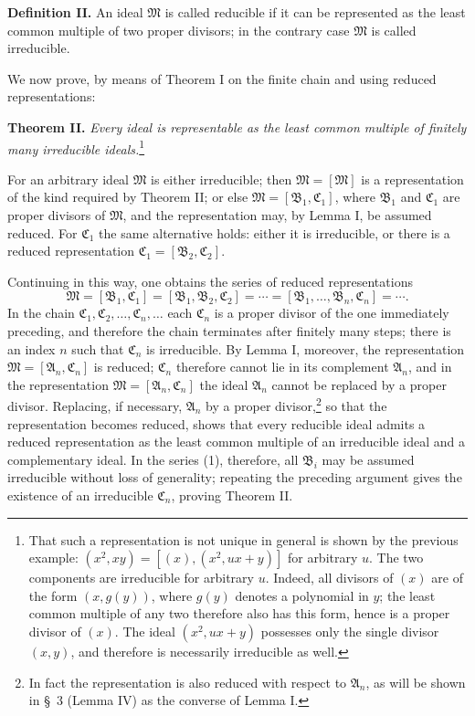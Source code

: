 \documentclass[11pt]{article}
\providecommand{\ideal}[1]{\mathfrak{#1}}
\begin{document}
\textbf{Definition II.} An ideal $\ideal M$ is called reducible if it can be represented as the least common multiple of two proper divisors; in the contrary case $\ideal M$ is called irreducible.

We now prove, by means of Theorem I on the finite chain and using reduced representations:

\textbf{Theorem II.} \emph{Every ideal is representable as the least common multiple of finitely many irreducible ideals.}\footnote{That such a representation is not unique in general is shown by the previous example: $(x^2,xy)=[(x),(x^2,ux+y)]$ for arbitrary $u$. The two components are irreducible for arbitrary $u$. Indeed, all divisors of $(x)$ are of the form $(x,g(y))$, where $g(y)$ denotes a polynomial in $y$; the least common multiple of any two therefore also has this form, hence is a proper divisor of $(x)$. The ideal $(x^2,ux+y)$ possesses only the single divisor $(x,y)$, and therefore is necessarily irreducible as well.}

For an arbitrary ideal $\ideal M$ is either irreducible; then $\ideal M=[\ideal M]$ is a representation of the kind required by Theorem II; or else $\ideal M=[\ideal B_1,\ideal C_1]$, where $\ideal B_1$ and $\ideal C_1$ are proper divisors of $\ideal M$, and the representation may, by Lemma I, be assumed reduced. For $\ideal C_1$ the same alternative holds: either it is irreducible, or there is a reduced representation $\ideal C_1=[\ideal B_2,\ideal C_2]$.

Continuing in this way, one obtains the series of reduced representations
\begin{equation}
 \ideal M=[\ideal B_1,\ideal C_1]=[\ideal B_1,\ideal B_2,\ideal C_2]=\cdots=[\ideal B_1,\ldots,\ideal B_n,\ideal C_n]=\cdots .
\tag{1}
\end{equation}
In the chain $\ideal C_1,\ideal C_2,\ldots,\ideal C_n,\ldots$ each $\ideal C_n$ is a proper divisor of the one immediately preceding, and therefore the chain terminates after finitely many steps; there is an index $n$ such that $\ideal C_n$ is irreducible. By Lemma I, moreover, the representation $\ideal M=[\ideal A_n,\ideal C_n]$ is reduced; $\ideal C_n$ therefore cannot lie in its complement $\ideal A_n$, and in the representation $\ideal M=[\ideal A_n,\ideal C_n]$ the ideal $\ideal A_n$ cannot be replaced by a proper divisor. Replacing, if necessary, $\ideal A_n$ by a proper divisor,\footnote{In fact the representation is also reduced with respect to $\ideal A_n$, as will be shown in \S~3 (Lemma IV) as the converse of Lemma I.} so that the representation becomes reduced, shows that every reducible ideal admits a reduced representation as the least common multiple of an irreducible ideal and a complementary ideal. In the series (1), therefore, all $\ideal B_i$ may be assumed irreducible without loss of generality; repeating the preceding argument gives the existence of an irreducible $\ideal C_n$, proving Theorem II.
\end{document}
